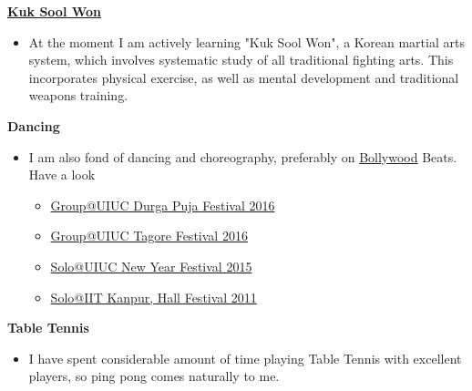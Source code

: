 \documentclass[9pt]{article}
\newenvironment{changemargin}[2]{%
  \begin{list}{}{%
    \setlength{\topsep}{0pt}%
    \setlength{\leftmargin}{#1}%
    \setlength{\rightmargin}{#2}%
    \setlength{\listparindent}{\parindent}%
    \setlength{\itemindent}{\parindent}%
    \setlength{\parsep}{\parskip}%
  }%
  \item[]}{\end{list}
}
\newenvironment{body} {
	\vspace*{-16pt}
	\begin{changemargin}{-0.25in}{-0.5in}
  }	
	{\end{changemargin}
}
\begin{document}
\begin{body}
	\vspace{14pt}

	\href{https://en.wikipedia.org/wiki/Kuk\_Sool\_Won}{\textbf{Kuk Sool Won}}\\
	\vspace*{-4pt}
	\begin{itemize} \itemsep -0pt  %
                \item  

                  At the moment I am actively learning "Kuk Sool Won", a Korean
                  martial arts system, which involves systematic study of all
                  traditional fighting arts. This incorporates physical
                  exercise, as well as mental development and traditional
                  weapons training.
                  
                \end{itemize}

	\textbf{Dancing}\\
	\vspace*{-4pt}
	\begin{itemize} \itemsep -0pt  %
            \item I am also fond of dancing and choreography, preferably on \href{https://en.wikipedia.org/wiki/Bollywood}{Bollywood} Beats. Have a look
	        \begin{itemize} \itemsep -0pt  %
                    \item \href{https://www.youtube.com/watch?v=jx-HcAEbJaw&feature=youtu.be}{Group@UIUC Durga Puja Festival 2016}
                    \item \href{https://www.youtube.com/watch?v=PfqsE7sajm8&feature=youtu.be}{Group@UIUC Tagore Festival 2016}
                    \item \href{https://www.youtube.com/watch?v=XG6ViBPG7yE}{Solo@UIUC New Year Festival 2015}
                    \item \href{https://www.youtube.com/watch?v=F8xdb7LkSrw}{Solo@IIT Kanpur, Hall Festival 2011}
                \end{itemize}
         \end{itemize}

	\textbf{Table Tennis}\\
	\vspace*{-4pt}
	\begin{itemize} \itemsep -0pt  %
                \item  
                  I have spent considerable amount of time playing Table Tennis
                  with excellent players, so ping pong comes naturally  to me.
                \end{itemize}
\end{body}
\end{document}
